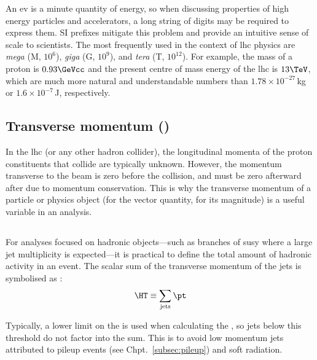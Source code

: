 An \acrlong{ev} is a minute quantity of energy, so when discussing properties of high energy particles and accelerators, a long string of digits may be required to express them. SI prefixes mitigate this problem and provide an intuitive sense of scale to scientists. The most frequently used in the context of \acrshort{lhc} physics are \emph{mega} (M, $\text{10}^6$), \emph{giga} (G, $\text{10}^9$), and \emph{tera} (T, $\text{10}^{12}$). For example, the mass of a proton is $\text{0.93}\GeVcc$ and the present centre of mass energy of the \acrshort{lhc} is $\text{13}\TeV$, which are much more natural and understandable numbers than $\text{1.78}\times \text{10}^{-27}$\,kg or $\text{1.6}\times \text{10}^{-7}$\,J, respectively.




\subsection{Transverse momentum (\texorpdfstring{\ptvec}{pt})}
\label{subsec:objects_pt}

In the \acrshort{lhc} (or any other hadron collider), the longitudinal momenta of the proton constituents that collide are typically unknown. However, the momentum transverse to the beam is zero before the collision, and must be zero afterward after due to momentum conservation. This is why the transverse momentum of a particle or physics object (\ptvec for the vector quantity, \pt for its magnitude) is a useful variable in an analysis.




\subsection{\texorpdfstring{\HT}{HT}}
\label{subsec:objects_ht}

For analyses focused on hadronic objects---such as branches of \acrlong{susy} where a large \gls{jet} multiplicity is expected---it is practical to define the total amount of hadronic activity in an event. The scalar sum of the transverse momentum of the \glspl{jet} is symbolised as \HT:
\begin{equation}
    \HT \equiv \sum_{\mathrm{jets}} \pt
    \label{eq:ht_definition}
\end{equation}

Typically, a lower limit on the \pt is used when calculating the \HT, so \glspl{jet} below this threshold do not factor into the sum. This is to avoid low momentum \glspl{jet} attributed to pileup events (see Chpt.~\ref{subsec:pileup}) and soft radiation.


